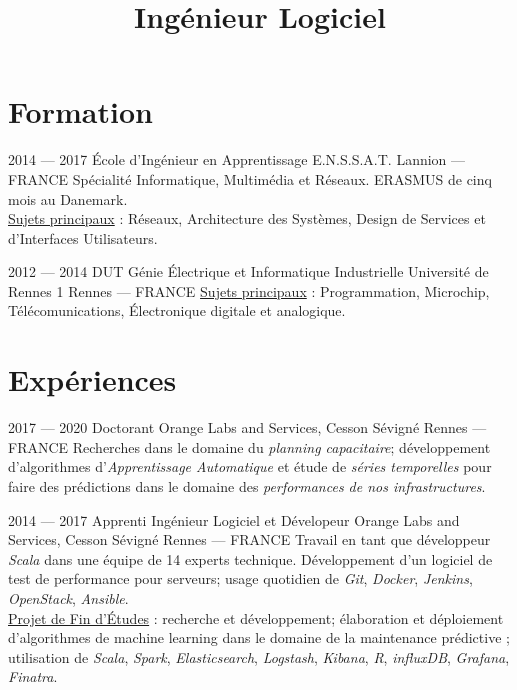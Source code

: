 \documentclass[11pt,a4paper,sans]{moderncv}        %
\title{Ingénieur Logiciel}                               %
\begin{document}
\makecvtitle

\section{Formation}

\cventry
{2014 — 2017}
{École d'Ingénieur en Apprentissage}
{E.N.S.S.A.T.}
{Lannion — FRANCE}
{}
{Spécialité Informatique, Multimédia et Réseaux. ERASMUS de cinq mois au Danemark.\\
 \underline{Sujets principaux} : Réseaux, Architecture des Systèmes, Design de Services et d'Interfaces Utilisateurs.}  %

\cventry
{2012 — 2014}
{DUT Génie Électrique et Informatique Industrielle}
{Université de Rennes 1}
{Rennes — FRANCE}
{}
{\underline{Sujets principaux} : Programmation, Microchip, Télécomunications, Électronique digitale et analogique.}

\section{Expériences}

\cventry
{2017 — 2020}
{Doctorant}
{Orange Labs and Services, Cesson S\'evign\'e}
{Rennes — FRANCE}
{}
{Recherches dans le domaine du \emph{planning capacitaire}; développement d'algorithmes d'\emph{Apprentissage Automatique} et étude de \emph{séries temporelles} pour faire des prédictions dans le domaine des \emph{performances de nos infrastructures}.}


\cventry
{2014 — 2017}
{Apprenti Ingénieur Logiciel et Dévelopeur}
{Orange Labs and Services, Cesson S\'evign\'e}
{Rennes — FRANCE}
{}
{Travail en tant que développeur \emph{Scala} dans une équipe de 14 experts technique. Développement d'un logiciel de test de performance pour serveurs; usage quotidien de \emph{Git}, \emph{Docker}, \emph{Jenkins}, \emph{OpenStack}, \emph{Ansible}.\\\underline{Projet de Fin d'Études} : recherche et développement; élaboration et déploiement d'algorithmes de machine learning dans le domaine de la maintenance prédictive ; utilisation de \emph{Scala}, \emph{Spark}, \emph{Elasticsearch}, \emph{Logstash}, \emph{Kibana}, \emph{R}, \emph{influxDB}, \emph{Grafana}, \emph{Finatra}.}
\end{document}
